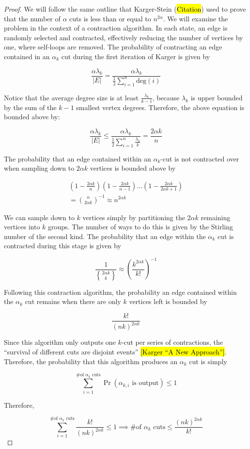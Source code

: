 \documentclass{acm_proc_article-sp}
\DeclareRobustCommand{\stirling}{\genfrac\{\}{0pt}{}}
\begin{document}
\begin{proof}
We will follow the same outline that Karger-Stein (\hl{Citation}) used to prove that the number of $\alpha$ cuts is less than or equal to $n^{2 \alpha}$. We will examine the problem in the context of a contraction algorithm. In each state, an edge is randomly selected and contracted, effectively reducing the number of vertices by one, where self-loops are removed. The probability of contracting an edge contained in an $\alpha_k$ cut during the first iteration of Karger is given by

\[
\frac{\alpha \lambda_k}{|E|} = \frac{\alpha \lambda_k}{\frac{1}{2} \sum_{i=1}^n \text{deg}(i)}
\]

Notice that the average degree size is at least $\frac{\lambda_k}{k-1}$, because $\lambda_k$ is upper bounded by the sum of the $k-1$ smallest vertex degrees. Therefore, the above equation is bounded above by:

\[
\frac{\alpha \lambda_k}{|E|} \leq \frac{\alpha \lambda_k}{\frac{1}{2} \sum_{i=1}^n \frac{\lambda_k}{k}} = \frac{2 \alpha k}{n}
\]

The probability that an edge contained within an $\alpha_k$-cut is not contracted over when sampling down to $2 \alpha k$ vertices is bounded above by 

\begin{align*}
\left (1 - \frac{2 \alpha k}{n} \right) \left(1 - \frac{2 \alpha k}{n-1} \right) \ldots \left( 1 - \frac{2 \alpha k}{2 \alpha k + 1}\right) \\ = \binom{n}{2 \alpha k}^{-1} \approx n^{2 \alpha k}
\end{align*}

We can sample down to $k$ vertices simply by partitioning the 
$2 \alpha k$ remaining vertices into $k$ groups. The number of ways to do this is given by the Stirling number of the second kind. The probability that an edge within the $\alpha_k$ cut is contracted during this stage is given by

\[
\frac{1}{ \stirling{2 \alpha k }{k} } \approx \left( \frac{k^{2 \alpha k}}{k!} \right)^{-1}
\]

Following this contraction algorithm, the probability an edge contained within the $\alpha_k$ cut remains when there are only $k$ vertices left is bounded by

\[
\frac{k!}{(nk)^{2 \alpha k}}
\]

Since this algorithm only outputs one $k$-cut per series of contractions, the ``survival of different cuts are disjoint events'' \hl{[Karger ``A New Approach'']}. Therefore, the probability that this algorithm produces an $\alpha_k$ cut is simply

\[
\sum_{i=1}^{\text{\# of } \alpha_k \text{ cuts}} \Pr(\alpha_{k,i} \text{ is output}) \leq 1
\]

Therefore, 

\[
\sum_{i=1}^{\text{\# of } \alpha_k \text{ cuts}} \frac{k!}{(nk)^{2 \alpha k}} \leq 1 \implies \text{\# of } \alpha_k \text{ cuts} \leq \frac{(nk)^{2 \alpha k}}{k!}
\]

\end{proof}
\end{document}
